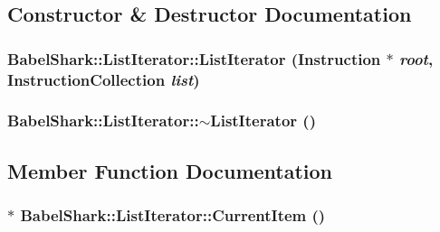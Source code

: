 \subsection{Constructor \& Destructor Documentation}
\hypertarget{class_babel_shark_1_1_list_iterator_d2805f8d13f76c5f7d0153571ab02baa}{
\subsubsection[{ListIterator}]{\setlength{\rightskip}{0pt plus 5cm}BabelShark::ListIterator::ListIterator ({\bf Instruction} $\ast$ {\em root}, \/  {\bf InstructionCollection} {\em list})}}
\label{class_babel_shark_1_1_list_iterator_d2805f8d13f76c5f7d0153571ab02baa}


\hypertarget{class_babel_shark_1_1_list_iterator_9d5877a0af0b57936dffcc2113e5eb16}{
\subsubsection[{$\sim$ListIterator}]{\setlength{\rightskip}{0pt plus 5cm}BabelShark::ListIterator::$\sim$ListIterator ()}}
\label{class_babel_shark_1_1_list_iterator_9d5877a0af0b57936dffcc2113e5eb16}




\subsection{Member Function Documentation}
\hypertarget{class_babel_shark_1_1_list_iterator_2d1d087f5dc2154cde21b6e8a75d7ff1}{
\subsubsection[{CurrentItem}]{ $\ast$ BabelShark::ListIterator::CurrentItem ()}}
\label{class_babel_shark_1_1_list_iterator_2d1d087f5dc2154cde21b6e8a75d7ff1}




